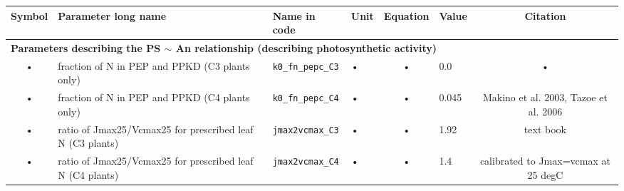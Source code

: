 \begin{table}
\begin{tabularx}{\linewidth}{|c|X|l|l|c|l|c|} %
\hline 
Symbol & Parameter long name & Name in code & Unit & Equation & Value & Citation \\ 
\hline

\multicolumn{6}{l}{\bf Parameters describing the PS $\sim$ An relationship (describing photosynthetic activity)}\\
\hline
• & fraction of N in PEP and PPKD (C3 plants only) & \texttt{k0\_fn\_pepc\_C3} & • & • & 0.0 & • \\ 
• & fraction of N in PEP and PPKD (C4 plants only) & \texttt{k0\_fn\_pepc\_C4} & • & • & 0.045 & Makino et al. 2003, Tazoe et al. 2006 \\ 
• & ratio of Jmax25/Vcmax25 for prescribed leaf N (C3 plants) & \texttt{jmax2vcmax\_C3} & • & • & 1.92 & text book \\ 
• & ratio of Jmax25/Vcmax25 for prescribed leaf N (C4 plants) & \texttt{jmax2vcmax\_C4} & • & • & 1.4 & calibrated to Jmax=vcmax at 25 degC \\
\hline
\end{tabularx}
\end{table}


